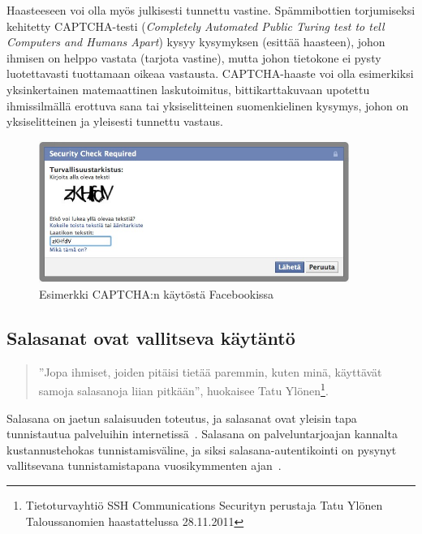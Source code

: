 \documentclass[finnish,gradu]{tktltiki}
\begin{document}
  Haasteeseen voi olla myös julkisesti tunnettu vastine. Spämmibottien torjumiseksi kehitetty CAPTCHA-testi (\emph{Completely Automated Public Turing test to tell Computers and Humans Apart}) kysyy kysymyksen (esittää haasteen), johon ihmisen on helppo vastata (tarjota vastine), mutta johon tietokone ei pysty luotettavasti tuottamaan oikeaa vastausta. CAPTCHA-haaste voi olla esimerkiksi yksinkertainen matemaattinen laskutoimitus, bittikarttakuvaan upotettu ihmissilmällä erottuva sana tai yksiselitteinen suomenkielinen kysymys, johon on yksiselitteinen ja yleisesti tunnettu vastaus.

  \begin{figure}
    \centering
    \includegraphics[width=0.9\textwidth]{images/Facebook_captcha_filled.jpg}
    \caption{Esimerkki CAPTCHA:n käytöstä Facebookissa}
    \label{fig:captcha_facebook}
  \end{figure}



  \subsection{Salasanat ovat vallitseva käytäntö} %
  \label{sub:salasanat}

  \begin{quote}
    ''Jopa ihmiset, joiden pitäisi tietää paremmin, kuten minä, käyttävät samoja salasanoja liian pitkään'', huokaisee Tatu Ylönen\footnote{Tietoturvayhtiö SSH Communications Securityn perustaja Tatu Ylönen Taloussanomien haastattelussa 28.11.2011}.
  \end{quote}

  Salasana on jaetun salaisuuden toteutus, ja salasanat ovat yleisin tapa tunnistautua palveluihin internetissä~\cite{study_of_passwords_07, passpet_06, password_management_strategies_06, pwdhash_extension_05}. Salasana on palveluntarjoajan kannalta kustannustehokas tunnistamisväline, ja siksi salasana-autentikointi on pysynyt vallitsevana tunnistamistapana vuosikymmenten ajan~\cite{pw_auth_system_perspective_08}.
\end{document}
